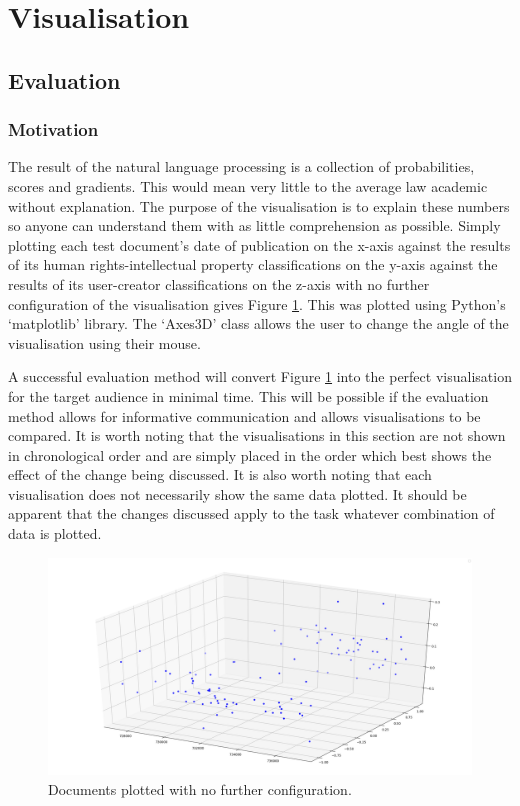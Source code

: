 	\section{Visualisation}
		\subsection{Evaluation}
			\subsubsection{Motivation}
			    The result of the natural language processing is a collection of probabilities, scores and gradients. This would mean very little to the average law academic without explanation. The purpose of the visualisation is to explain these numbers so anyone can understand them with as little comprehension as possible. Simply plotting each test document's date of publication on the x-axis against the results of its human rights-intellectual property classifications on the y-axis against the results of its user-creator classifications on the z-axis with no further configuration of the visualisation gives Figure \ref{fig:blank-vis}. This was plotted using Python's `matplotlib' library. The `Axes3D' class allows the user to change the angle of the visualisation using their mouse.
			    
			    A successful evaluation method will convert Figure \ref{fig:blank-vis} into the perfect visualisation for the target audience in minimal time. This will be possible if the evaluation method allows for informative communication and allows visualisations to be compared. It is worth noting that the visualisations in this section are not shown in chronological order and are simply placed in the order which best shows the effect of the change being discussed. It is also worth noting that each visualisation does not necessarily show the same data plotted. It should be apparent that the changes discussed apply to the task whatever combination of data is plotted.
				\begin{figure}
    				\centering
    				\includegraphics[width=0.9\linewidth]{resources/images/blank_vis.png}
    				\caption{Documents plotted with no further configuration.}
    				\label{fig:blank-vis}
				\end{figure}
				
